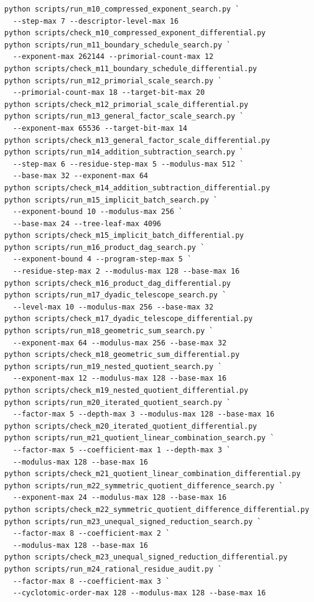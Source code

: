 \documentclass[11pt]{article}
\begin{document}
\begin{verbatim}
python scripts/run_m10_compressed_exponent_search.py `
  --step-max 7 --descriptor-level-max 16
python scripts/check_m10_compressed_exponent_differential.py
python scripts/run_m11_boundary_schedule_search.py `
  --exponent-max 262144 --primorial-count-max 12
python scripts/check_m11_boundary_schedule_differential.py
python scripts/run_m12_primorial_scale_search.py `
  --primorial-count-max 18 --target-bit-max 20
python scripts/check_m12_primorial_scale_differential.py
python scripts/run_m13_general_factor_scale_search.py `
  --exponent-max 65536 --target-bit-max 14
python scripts/check_m13_general_factor_scale_differential.py
python scripts/run_m14_addition_subtraction_search.py `
  --step-max 6 --residue-step-max 5 --modulus-max 512 `
  --base-max 32 --exponent-max 64
python scripts/check_m14_addition_subtraction_differential.py
python scripts/run_m15_implicit_batch_search.py `
  --exponent-bound 10 --modulus-max 256 `
  --base-max 24 --tree-leaf-max 4096
python scripts/check_m15_implicit_batch_differential.py
python scripts/run_m16_product_dag_search.py `
  --exponent-bound 4 --program-step-max 5 `
  --residue-step-max 2 --modulus-max 128 --base-max 16
python scripts/check_m16_product_dag_differential.py
python scripts/run_m17_dyadic_telescope_search.py `
  --level-max 10 --modulus-max 256 --base-max 32
python scripts/check_m17_dyadic_telescope_differential.py
python scripts/run_m18_geometric_sum_search.py `
  --exponent-max 64 --modulus-max 256 --base-max 32
python scripts/check_m18_geometric_sum_differential.py
python scripts/run_m19_nested_quotient_search.py `
  --exponent-max 12 --modulus-max 128 --base-max 16
python scripts/check_m19_nested_quotient_differential.py
python scripts/run_m20_iterated_quotient_search.py `
  --factor-max 5 --depth-max 3 --modulus-max 128 --base-max 16
python scripts/check_m20_iterated_quotient_differential.py
python scripts/run_m21_quotient_linear_combination_search.py `
  --factor-max 5 --coefficient-max 1 --depth-max 3 `
  --modulus-max 128 --base-max 16
python scripts/check_m21_quotient_linear_combination_differential.py
python scripts/run_m22_symmetric_quotient_difference_search.py `
  --exponent-max 24 --modulus-max 128 --base-max 16
python scripts/check_m22_symmetric_quotient_difference_differential.py
python scripts/run_m23_unequal_signed_reduction_search.py `
  --factor-max 8 --coefficient-max 2 `
  --modulus-max 128 --base-max 16
python scripts/check_m23_unequal_signed_reduction_differential.py
python scripts/run_m24_rational_residue_audit.py `
  --factor-max 8 --coefficient-max 3 `
  --cyclotomic-order-max 128 --modulus-max 128 --base-max 16

\end{verbatim}
\end{document}
